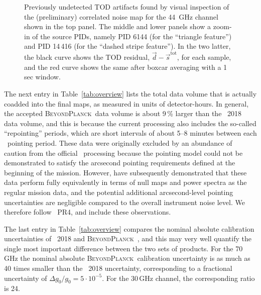 \documentclass[twocolumn]{aa}
\renewcommand{\d}[0]{\vec{d}}
\newcommand{\s}[0]{\vec{s}}
\newcommand{\BP}{\textsc{BeyondPlanck}}
\begin{document}
\begin{figure}[t]
  \caption{Previously undetected TOD artifacts found by visual inspection of the (preliminary) correlated noise map for the 44 \,GHz channel shown in the top panel. The middle and lower panels show a zoom-in of the source PIDs, namely PID 6144 (for the ``triangle feature'') and PID 14\,416 (for the ``dashed stripe feature''). In the two latter, the black curve shows the TOD residual, $\d-\s^{\mathrm{tot}}$, for each sample, and the red curve shows the same after boxcar averaging with a 1\,sec window.}
  \label{fig:features}
\end{figure}

The next entry in Table~\ref{tab:overview} lists the total data volume
that is actually coadded into the final maps, as measured in units of
detector-hours. In general, the accepted \BP\ data volume is about
9\,\% larger than the \Planck\ 2018 data volume, and this is
because the current processing also includes the so-called
``repointing'' periods, which are short intervals of about 5--8
minutes between each \Planck\ pointing period. These data were
originally excluded by an abundance of caution from the official
\Planck\ processing because the pointing model could not be
demonstrated to satisfy the arcsecond pointing requirements defined at
the beginning of the mission. However, \citet{npipe} have subsequently
demonstrated that these data perform fully equivalently in terms of
null maps and power spectra as the regular mission data, and the
potential additional arcsecond-level pointing uncertainties are
negligible compared to the overall instrument noise level. We
therefore follow \Planck\ PR4, and include these observations.

The last entry in Table~\ref{tab:overview} compares the nominal
absolute calibration uncertainties of \Planck\ 2018 and
\BP\ \citep{bp09}, and this may very well quantify the single most
important difference between the two sets of products. For the 70\,GHz
the nominal absolute \BP\ calibration uncertainty is as much as 40
times smaller than the \Planck\ 2018 uncertainty, corresponding to a
fractional uncertainty of $\Delta g_0/g_0 = 5\cdot10^{-5}$. For the
30\,GHz channel, the corresponding ratio is 24.
\end{document}
